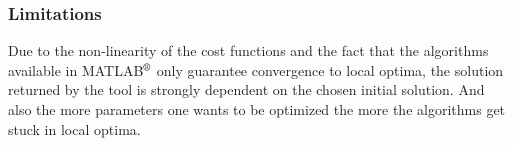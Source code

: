 \begin{table}[!h]
\begin{center}
 \caption{List of the metrics returned by the optimization tool.}\vspace{1ex}
 \label{tab:tab_metrics}
\end{center}
\end{table}

\subsubsection{Limitations}
\label{sec:limitations}
Due to the non-linearity of the cost functions and the fact that the algorithms
available in MATLAB$^\textrm{\textregistered}$ only guarantee convergence
to local optima, the solution returned by the tool is strongly dependent on the
chosen initial solution. And also the more parameters one wants to be optimized the
more the algorithms get stuck in local optima.

